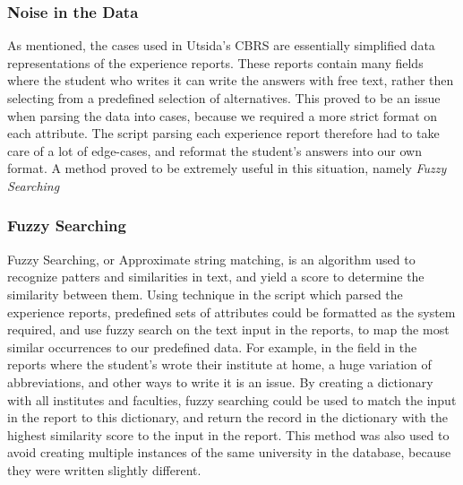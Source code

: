 \subsubsection{Noise in the Data}
As mentioned, the cases used in Utsida's CBRS are essentially simplified data representations of the experience reports. These reports contain many fields where the student who writes it can write the answers with free text, rather then selecting from a predefined selection of alternatives. This proved to be an issue when parsing the data into cases, because we required a more strict format on each attribute. The script parsing each experience report therefore had to take care of a lot of edge-cases, and reformat the student's answers into our own format. A method proved to be extremely useful in this situation, namely \emph{Fuzzy Searching}

\subsubsection{Fuzzy Searching}
Fuzzy Searching, or Approximate string matching, is an algorithm used to recognize patters and similarities in text, and yield a score to determine the similarity between them. Using technique in the script which parsed the experience reports, predefined sets of attributes could be formatted as the system required, and use fuzzy search on the text input in the reports, to map the most similar occurrences to our predefined data. For example, in the field in the reports where the student's wrote their institute at home, a huge variation of abbreviations, and other ways to write it is an issue. By creating a dictionary with all institutes and faculties, fuzzy searching could be used to match the input in the report to this dictionary, and return the record in the dictionary with the highest similarity score to the input in the report. This method was also used to avoid creating multiple instances of the same university in the database, because they were written slightly different.


\cleardoublepage